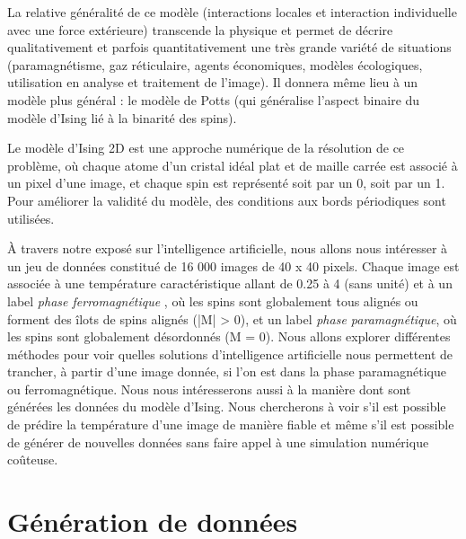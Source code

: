 \documentclass[11pt]{scrartcl} %
\begin{document}
\vspace{2mm} 
La relative généralité de ce modèle (interactions locales et interaction individuelle avec une force extérieure) transcende la physique et permet de décrire qualitativement et parfois quantitativement une très grande variété de situations (paramagnétisme, gaz réticulaire, agents économiques, modèles écologiques, utilisation en analyse et traitement de l'image). Il donnera même lieu à un modèle plus général : le modèle de Potts (qui généralise l'aspect binaire du modèle d'Ising lié à la binarité des spins).

\vspace{2mm}

Le modèle d'Ising 2D est une approche numérique de la résolution de ce problème, où chaque atome d'un cristal idéal plat et de maille carrée est associé à un pixel d'une image, et chaque spin est représenté soit par un 0, soit par un 1. Pour améliorer la validité du modèle, des conditions aux bords périodiques sont utilisées.

\vspace{2mm}
À travers notre exposé sur l'intelligence artificielle, nous allons nous intéresser à un jeu de données constitué de 16 000 images de 40 x 40 pixels. Chaque image est associée à une température caractéristique allant de 0.25 à 4 (sans unité) et à un label \textit{phase ferromagnétique} , où les spins sont globalement tous alignés ou forment des îlots de spins alignés (|M| > 0), et un label \textit{phase paramagnétique}, où les spins sont globalement désordonnés (M = 0).
\vspace{2mm}
Nous allons explorer différentes méthodes pour voir quelles solutions d'intelligence artificielle nous permettent de trancher, à partir d'une image donnée, si l'on est dans la phase paramagnétique ou ferromagnétique. Nous nous intéresserons aussi à la manière dont sont générées les données du modèle d'Ising. Nous chercherons à voir s'il est possible de prédire la température d'une image de manière fiable et même s'il est possible de générer de nouvelles données sans faire appel à une simulation numérique coûteuse.
\vspace{2mm}
\section{Génération de données}
\end{document}
